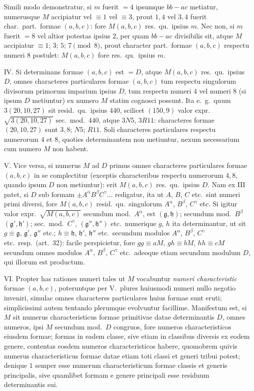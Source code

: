 \documentclass[12pt,a4paper]{article}
\theoremstyle{plain}
\theoremstyle{definition}
\theoremstyle{remark}
\begin{document}
Simili modo demonstratur, si $m$ fuerit $=4$ ipsumque $bb-ac$ metiatur, numerusque $M$ accipiatur vel $\equiv 1$ vel $\equiv 3$, prout $1,4$ vel $3,4$ fuerit char.\ part.\ formae $(a,b,c)$: fore $M(a,b,c)$ res.\ qu.\ ipsius $m$. Nec non, si $m$ fuerit $=8$ vel altior potestas ipsius $2$, per quam $bb-ac$ divisibilis sit, atque $M$ accipiatur $\equiv 1$; $3$; $5$; $7\pmod{8}$, prout character part.\ formae $(a,b,c)$ respectu numeri $8$ postulet: $M(a,b,c)$ fore res.\ qu.\ ipsius $m$.

IV. Si determinans formae $(a,b,c)$ est $=D$, atque $M(a,b,c)$ res.\ qu.\ ipsius $D$, omnes characteres particulares formae $(a,b,c)$ tum respectu singulorum divisorum primorum imparium ipsius $D$, tum respectu numeri $4$ vel numeri $8$ (si ipsum $D$ metiuntur) ex numero $M$ statim cognosci possunt. Ita e.\ g.\ quum $3(20,10,27)$ sit resid.\ qu.\ ipsius $440$, scilicet $(150,9)$ valor expr.\ $\sqrt{3(20,10,27)}$ sec.\ mod.\ $440$, atque $3N5$, $3R11$: characteres formae $(20,10,27)$ sunt $3,8$; $N5$; $R11$. Soli characteres particulares respectu numerorum $4$ et $8$, quoties determinantem non metiuntur, nexum necessarium cum numero $M$ non habent.

V. Vice versa, si numerus $M$ ad $D$ primus omnes characteres particulares formae $(a,b,c)$ in se complectitur (exceptis characteribus respectu numerorum $4,8$, quando ipsum $D$ non metiuntur): erit $M(a,b,c)$ res.\ qu.\ ipsius $D$. Nam ex III patet, si $D$ sub formam $\pm A^\alpha B^\beta C^\gamma\ldots$ redigatur, ita ut $A$, $B$, $C$ etc.\ sint numeri primi diversi, fore $M(a,b,c)$ resid.\ qu.\ singulorum $A^\alpha$, $B^\beta$, $C^\gamma$ etc. Si igitur valor expr.\ $\sqrt{M(a,b,c)}$ secundum mod.\ $A^\alpha$, est $(\mathfrak{g},\mathfrak{h})$; secundum mod.\ $B^\beta$ $(\mathfrak{g}',\mathfrak{h}')$; sec.\ mod.\ $C^\gamma$, $(\mathfrak{g}'',\mathfrak{h}'')$ etc.\ numerique $g$, $h$ ita determinantur, ut sit $g\equiv \mathfrak{g}$, $\mathfrak{g}'$, $\mathfrak{g}''$ etc.; $h\equiv \mathfrak{h}$, $\mathfrak{h}'$, $\mathfrak{h}''$ etc.\ secundum modulos $A^\alpha$, $B^\beta$, $C^\gamma$ etc.\ resp.\ (art.\ 32): facile perspicietur, fore $gg\equiv aM$, $gh\equiv bM$, $hh\equiv cM$ secundum omnes modulos $A^\alpha$, $B^\beta$, $C^\gamma$ etc.\ adeoque etiam secundum modulum $D$, qui illorum est productum.

VI. Propter has rationes numeri tales ut $M$ vocabuntur \emph{numeri characteristic} formae $(a,b,c)$, poteruntque per V.\ plures huiusmodi numeri nullo negotio inveniri, simulac omnes characteres particulares huius formae sunt eruti; simplicissimi autem tentando plerumque evolvuntur facillime. Manifestum est, si $M$ sit numerus characteristicus formae primitivae datae determinantis $D$, omnes numeros, ipsi $M$ secundum mod.\ $D$ congruos, fore numeros characteristicos eiusdem formae; formas in eadem classe, sive etiam in classibus diversis ex eodem genere, contentas eosdem numeros characteristicos habere, quomobrem quivis numerus characteristicus formae datae etiam toti classi et generi tribui potest; denique $1$ semper esse numerum characteristicum formae classis et generis principalis, sive quamlibet formam e genere principali esse residuum determinantis sui.
\end{document}
